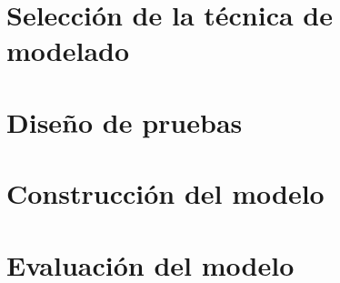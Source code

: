 \documentclass[11pt,letterpaper,DIV=12]{scrartcl}
\begin{document}


\tableofcontents
\clearpage




\section{Selección de la técnica de modelado}




\section{Diseño de pruebas}



\section{Construcción del modelo}




\section{Evaluación del modelo}





\printbibliography
\end{document}
